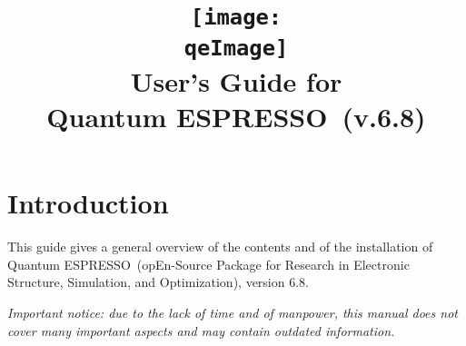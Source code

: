 \documentclass[12pt,a4paper]{article}
\def\version{6.8}
\def\qe{{\sc Quantum ESPRESSO}}
\begin{document}
\author{}
\date{}

\def\qeImage{quantum_espresso}

\title{
  \texttt{[image: \\qeImage]} \\
  \Huge User's Guide for \\ \qe\ (v.\version)
}

\maketitle

\tableofcontents

\section{Introduction}

This guide gives a general overview of the contents and of the installation
of \qe\ (opEn-Source Package for Research in Electronic Structure, Simulation,
and Optimization), version \version.

{\em Important notice: due to the lack of time and of manpower, this
  manual does not cover many important aspects and may contain outdated
  information.}
\end{document}
